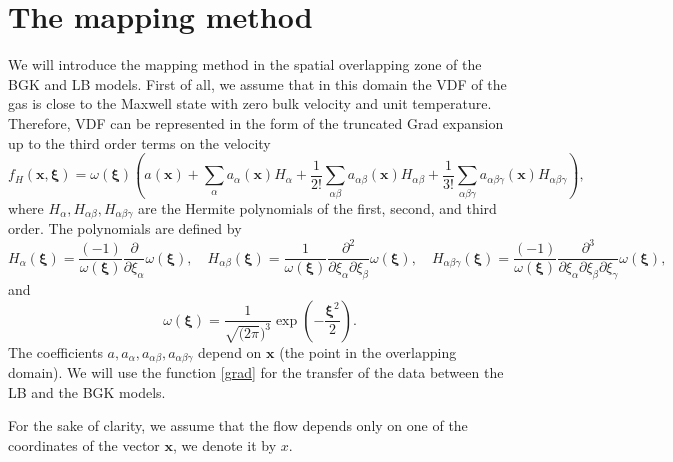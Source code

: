 \documentclass[]{elsarticle} %
\newcommand{\bxi}{\boldsymbol{\xi}}
\newcommand{\bx}{\boldsymbol{x}}
\begin{document}

\section{The mapping method}\label{sec:mapping}

We will introduce the mapping method in the spatial overlapping zone of the BGK and LB models.
First of all, we assume that in this domain the VDF of the gas is close to the Maxwell state with zero bulk velocity and unit temperature.
Therefore, VDF can be represented in the form of the truncated Grad expansion up to the third order terms on the velocity
\begin{equation}\label{grad}
    f_H(\bx,\bxi) = \omega(\bxi)\left(a(\bx) +\sum_{\alpha}a_{\alpha}(\bx)H_{\alpha}+\frac{1}{2!}\sum_{\alpha\beta}a_{\alpha \beta}(\bx)H_{\alpha\beta}+\frac{1}{3!}\sum_{\alpha\beta \gamma}a_{\alpha\beta\gamma}(\bx)H_{\alpha\beta\gamma}\right),
\end{equation}
where $H_{\alpha}, H_{\alpha\beta}, H_{\alpha\beta\gamma}$ are the Hermite polynomials of the first, second, and third order. The polynomials are defined by
$$
H_\alpha(\bxi)=\frac{(-1)}{\omega(\bxi)}\frac{\partial}{\partial \xi_\alpha}\omega(\bxi),  \quad H_{\alpha\beta}(\bxi)=\frac{1}{\omega(\bxi)}\frac{\partial^2}{\partial \xi_\alpha\partial \xi_\beta}\omega(\bxi),
\quad H_{\alpha\beta \gamma}(\bxi)=\frac{(-1)}{\omega(\bxi)}\frac{\partial^3}{\partial \xi_\alpha\partial \xi_\beta \partial \xi_\gamma}\omega(\bxi),
$$
and
$$
 \omega(\bxi)= \frac{1}{\sqrt{(2\pi})^3}\exp\left(-\frac{\bxi^2}{2}\right).
$$
 The coefficients $a, a_{\alpha},a_{\alpha\beta}, a_{\alpha\beta \gamma}$ depend on $\bx$ (the point in the overlapping domain).
 We will use the function \eqref{grad} for the transfer of the data between the LB and the BGK models.

For the sake of clarity, we assume that the flow depends only on one of the coordinates of the vector $\bx$, we denote it by $x$.
\end{document}
